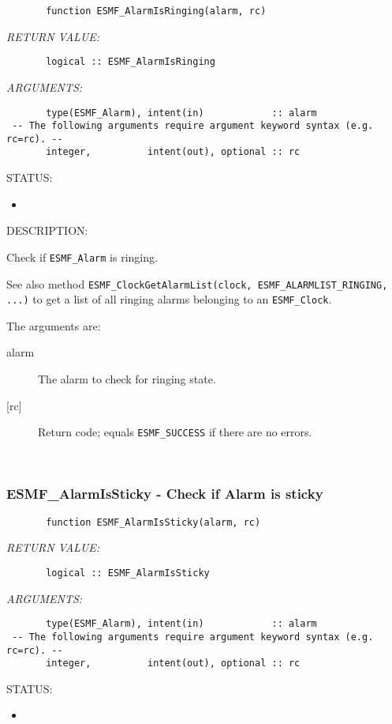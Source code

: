  
\begin{verbatim}       function ESMF_AlarmIsRinging(alarm, rc)\end{verbatim}{\em RETURN VALUE:}
\begin{verbatim}       logical :: ESMF_AlarmIsRinging
 \end{verbatim}{\em ARGUMENTS:}
\begin{verbatim}       type(ESMF_Alarm), intent(in)            :: alarm
 -- The following arguments require argument keyword syntax (e.g. rc=rc). --
       integer,          intent(out), optional :: rc
 \end{verbatim}
{\sf STATUS:}
   \begin{itemize}
   \item{}
   \end{itemize}
  
{\sf DESCRIPTION:\\ }


       Check if {\tt ESMF\_Alarm} is ringing.
  
       See also method
             {\tt ESMF\_ClockGetAlarmList(clock, ESMF\_ALARMLIST\_RINGING, ...)}
       to get a list of all ringing alarms belonging to an {\tt ESMF\_Clock}.
  
       The arguments are:
       \begin{description}
       \item[alarm]
            The alarm to check for ringing state.
       \item[{[rc]}]
            Return code; equals {\tt ESMF\_SUCCESS} if there are no errors.
       \end{description} 
 
\mbox{}\hrulefill\ 
 
\subsubsection [ESMF\_AlarmIsSticky] {ESMF\_AlarmIsSticky - Check if Alarm is sticky}


 
\begin{verbatim}       function ESMF_AlarmIsSticky(alarm, rc)\end{verbatim}{\em RETURN VALUE:}
\begin{verbatim}       logical :: ESMF_AlarmIsSticky
 \end{verbatim}{\em ARGUMENTS:}
\begin{verbatim}       type(ESMF_Alarm), intent(in)            :: alarm
 -- The following arguments require argument keyword syntax (e.g. rc=rc). --
       integer,          intent(out), optional :: rc
 \end{verbatim}
{\sf STATUS:}
   \begin{itemize}
   \item{}
   \end{itemize}
  
